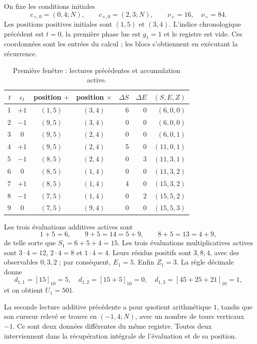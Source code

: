On fixe les conditions initiales
\[
 c_{+,0}=(0,4;N),\qquad c_{\times,0}=(2,3;N),
 \qquad \nu_+=16,\quad\nu_\times=84.
\]
Les positions positives initiales sont \((1,5)\) et \((3,4)\). L'indice
chronologique précédent est \(t=0\), la première phase lue est \(g_1=1\) et le
registre est vide. Ces coordonnées sont les entrées
du calcul ; les blocs s'obtiennent en exécutant la récurrence.

\begin{table}[htbp]
\caption{Première fenêtre : lectures précédentes et accumulation active.}
\label{act21:tpk:tabla-501}
\small
\begin{tabular}{@{}rcccrrr@{}}
\toprule
\(t\)&\(\epsilon_t\)&position \(+\)&position \(\times\)&
\(\Delta S\)&\(\Delta E\)&\((S,E,Z)\)\\
\midrule
1&\(+1\)&\((1,5)\)&\((3,4)\)&6&0&\((6,0,0)\)\\
2&\(-1\)&\((9,5)\)&\((3,4)\)&0&0&\((6,0,0)\)\\
3&0&\((9,5)\)&\((2,4)\)&0&0&\((6,0,1)\)\\
4&\(+1\)&\((9,5)\)&\((2,4)\)&5&0&\((11,0,1)\)\\
5&\(-1\)&\((8,5)\)&\((2,4)\)&0&3&\((11,3,1)\)\\
6&0&\((8,5)\)&\((1,4)\)&0&0&\((11,3,2)\)\\
7&\(+1\)&\((8,5)\)&\((1,4)\)&4&0&\((15,3,2)\)\\
8&\(-1\)&\((7,5)\)&\((1,4)\)&0&2&\((15,5,2)\)\\
9&0&\((7,5)\)&\((9,4)\)&0&0&\((15,5,3)\)\\
\bottomrule
\end{tabular}
\end{table}

Les trois évaluations additives actives sont
\[
 1+5=6,\qquad9+5=14=5+9,\qquad8+5=13=4+9,
\]
de telle sorte que \(S_1=6+5+4=15\). Les trois évaluations multiplicatives actives
sont \(3\cdot4=12\), \(2\cdot4=8\) et \(1\cdot4=4\). Leurs résidus
positifs sont \(3,8,4\), avec des observables \(0,3,2\) ; par conséquent,
\(E_1=5\). Enfin \(Z_1=3\). La règle décimale donne
\[
 d_{1,1}=[15]_{10}=5,\quad
 d_{1,2}=[15+5]_{10}=0,\quad
 d_{1,3}=[45+25+21]_{10}=1,
\]
et on obtient \(U_1=501\).

La seconde lecture additive précédente a pour quotient arithmétique \(1\),
tandis que son curseur relevé se trouve en \((-1,4;N)\), avec un nombre de tours
verticaux \(-1\). Ce sont deux données différentes du même registre. Toutes deux
interviennent dans la récupération intégrale de l'évaluation et de sa position.

